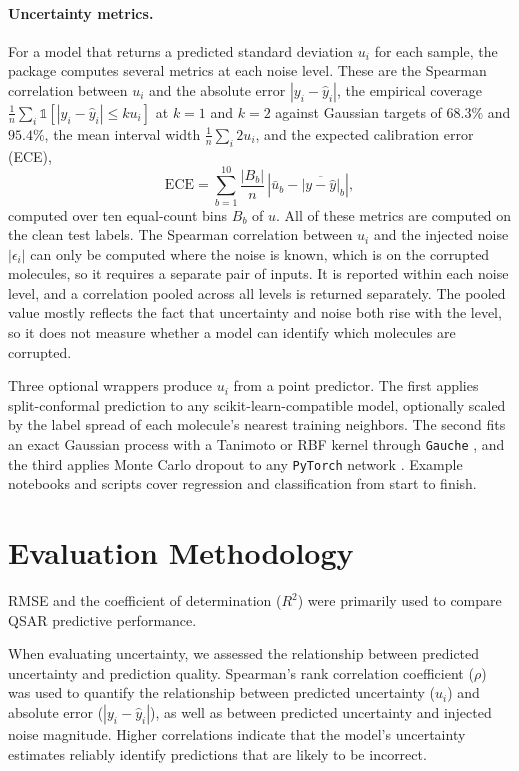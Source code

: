 \paragraph{Uncertainty metrics.} For a model that returns a predicted standard deviation
$u_i$ for each sample, the package computes several metrics at each noise level. These are the Spearman correlation between $u_i$ and the
absolute error $|y_i - \hat{y}_i|$, the empirical coverage $\frac{1}{n}\sum_i \mathbb{1}\left[|y_i -
\hat{y}_i| \le k u_i\right]$ at $k = 1$ and $k = 2$ against Gaussian targets of $68.3\%$ and
$95.4\%$, the mean interval width $\frac{1}{n}\sum_i 2u_i$, and the expected calibration error (ECE),
\begin{equation}
\mathrm{ECE} = \sum_{b=1}^{10} \frac{|B_b|}{n}\,\left|\bar{u}_b - \overline{|y - \hat{y}|}_b\right|,
\label{eq:ece}
\end{equation}
computed over ten equal-count bins $B_b$ of $u$. All of these metrics are computed on the clean test labels. The Spearman
correlation between $u_i$ and the injected noise $|\epsilon_i|$ can only be computed where the noise
is known, which is on the corrupted molecules, so it requires a separate pair of inputs. It is reported
within each noise level, and a correlation pooled across all levels is returned separately. The pooled value
mostly reflects the fact that uncertainty and noise both rise with the level, so it
does not measure whether a model can identify which molecules are corrupted.

Three optional wrappers produce $u_i$ from a point predictor. The first applies split-conformal prediction to any
scikit-learn-compatible model, optionally scaled by the label spread of each molecule's nearest
training neighbors. The second fits an exact Gaussian process with a Tanimoto or RBF kernel through \texttt{Gauche}
\citep{gauche}, and the third applies Monte Carlo dropout to any \texttt{PyTorch} network \citep{gal2016}. Example
notebooks and scripts cover regression and classification from start to finish.


\section{Evaluation Methodology}


RMSE and the coefficient of determination ($R^2$) were primarily used to compare QSAR predictive performance.


When evaluating uncertainty, we assessed the relationship between predicted uncertainty and prediction quality. Spearman's rank correlation coefficient ($\rho$) was used to quantify the relationship between predicted uncertainty ($u_i$) and absolute error ($|y_i - \hat{y}_i|$), as well as between predicted uncertainty and injected noise magnitude. Higher correlations indicate that the model's uncertainty estimates reliably identify predictions that are likely to be incorrect.

